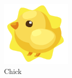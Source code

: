 
\begin{figure}[h]
  \centering
  \includegraphics[width=0.3\textwidth]{imagens/chick.png}
  \caption{Chick}
  \label{fig:LABEL_FIG_1}
\end{figure}







